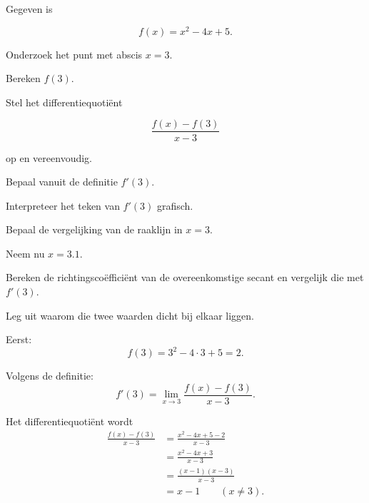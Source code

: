 \documentclass{ximera}
\begin{document}
\begin{oefening}{\oefU\ESS}

Gegeven is

\[
f(x)=x^2-4x+5.
\]

Onderzoek het punt met abscis $x=3$.

\begin{question}
Bereken $f(3)$.
\end{question}

\begin{question}
Stel het differentiequotiënt

\[
\frac{f(x)-f(3)}{x-3}
\]

op en vereenvoudig.
\end{question}

\begin{question}
Bepaal vanuit de definitie $f'(3)$.
\end{question}

\begin{question}
Interpreteer het teken van $f'(3)$ grafisch.
\end{question}

\begin{question}
Bepaal de vergelijking van de raaklijn in $x=3$.
\end{question}

\begin{question}
Neem nu $x=3.1$.

Bereken de richtingscoëfficiënt van de overeenkomstige secant en
vergelijk die met $f'(3)$.
\end{question}

\begin{question}
Leg uit waarom die twee waarden dicht bij elkaar liggen.
\end{question}

\begin{oplossing}

Eerst:
\[
f(3)=3^2-4\cdot3+5=2.
\]

Volgens de definitie:
\[
f'(3)
=
\lim_{x\to3}
\frac{f(x)-f(3)}{x-3}.
\]

Het differentiequotiënt wordt
\[
\begin{aligned}
\frac{f(x)-f(3)}{x-3}
&=
\frac{x^2-4x+5-2}{x-3}\\
&=
\frac{x^2-4x+3}{x-3}\\
&=
\frac{(x-1)(x-3)}{x-3}\\
&=
x-1
\qquad (x\neq3).
\end{aligned}
\]


\end{oplossing}
\end{oefening}
\end{document}
